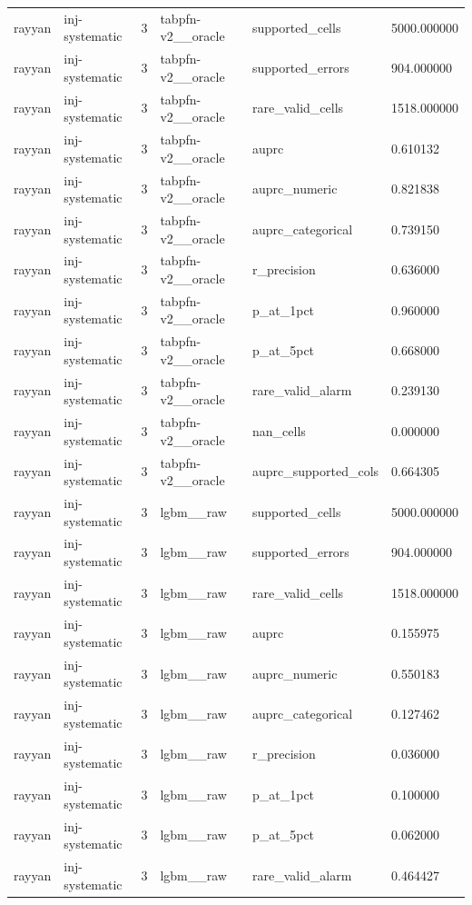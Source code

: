 \begin{tabular}{llllll}
rayyan & inj-systematic & 3 & tabpfn-v2\_\_oracle & supported\_cells & 5000.000000 \\
rayyan & inj-systematic & 3 & tabpfn-v2\_\_oracle & supported\_errors & 904.000000 \\
rayyan & inj-systematic & 3 & tabpfn-v2\_\_oracle & rare\_valid\_cells & 1518.000000 \\
rayyan & inj-systematic & 3 & tabpfn-v2\_\_oracle & auprc & 0.610132 \\
rayyan & inj-systematic & 3 & tabpfn-v2\_\_oracle & auprc\_numeric & 0.821838 \\
rayyan & inj-systematic & 3 & tabpfn-v2\_\_oracle & auprc\_categorical & 0.739150 \\
rayyan & inj-systematic & 3 & tabpfn-v2\_\_oracle & r\_precision & 0.636000 \\
rayyan & inj-systematic & 3 & tabpfn-v2\_\_oracle & p\_at\_1pct & 0.960000 \\
rayyan & inj-systematic & 3 & tabpfn-v2\_\_oracle & p\_at\_5pct & 0.668000 \\
rayyan & inj-systematic & 3 & tabpfn-v2\_\_oracle & rare\_valid\_alarm & 0.239130 \\
rayyan & inj-systematic & 3 & tabpfn-v2\_\_oracle & nan\_cells & 0.000000 \\
rayyan & inj-systematic & 3 & tabpfn-v2\_\_oracle & auprc\_supported\_cols & 0.664305 \\
rayyan & inj-systematic & 3 & lgbm\_\_raw & supported\_cells & 5000.000000 \\
rayyan & inj-systematic & 3 & lgbm\_\_raw & supported\_errors & 904.000000 \\
rayyan & inj-systematic & 3 & lgbm\_\_raw & rare\_valid\_cells & 1518.000000 \\
rayyan & inj-systematic & 3 & lgbm\_\_raw & auprc & 0.155975 \\
rayyan & inj-systematic & 3 & lgbm\_\_raw & auprc\_numeric & 0.550183 \\
rayyan & inj-systematic & 3 & lgbm\_\_raw & auprc\_categorical & 0.127462 \\
rayyan & inj-systematic & 3 & lgbm\_\_raw & r\_precision & 0.036000 \\
rayyan & inj-systematic & 3 & lgbm\_\_raw & p\_at\_1pct & 0.100000 \\
rayyan & inj-systematic & 3 & lgbm\_\_raw & p\_at\_5pct & 0.062000 \\
rayyan & inj-systematic & 3 & lgbm\_\_raw & rare\_valid\_alarm & 0.464427 \\

\end{tabular}
